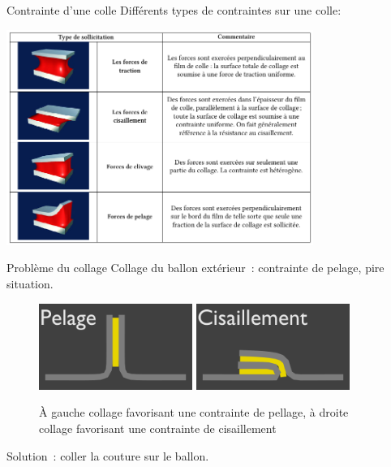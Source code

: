 \begin{frame}{Contrainte d'une colle}
  Différents types de contraintes sur une colle:
  \begin{center}
    \includegraphics[width=10cm]{../Images/colle_contraintes.png}
  \end{center}
\end{frame}

\begin{frame}{Problème du collage}
  Collage du ballon extérieur~: contrainte de pelage, pire situation.
  \begin{figure}
    \centering
    \includegraphics[width=5cm]{../Images/colle_pelage.png}
    \includegraphics[width=5cm]{../Images/colle_cisaillement.png}
    \caption{À gauche collage favorisant une contrainte de pellage, à droite collage favorisant une contrainte de cisaillement}
  \end{figure}
  Solution~: coller la couture sur le ballon.
\end{frame}

